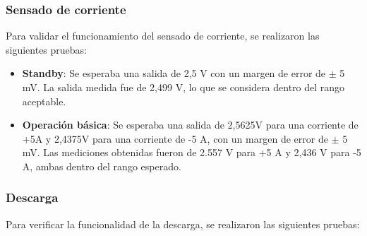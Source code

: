 \subsubsection{Sensado de corriente}

Para validar el funcionamiento del sensado de corriente, se realizaron las siguientes pruebas:

\begin{itemize}
	\item \textbf{Standby}: Se esperaba una salida de 2,5 V con un margen de error de $\pm$ 5 mV. La salida medida fue de 2,499 V, lo que se considera dentro del rango aceptable.
	
	\item \textbf{Operación básica}: Se esperaba una salida de 2,5625V para una corriente de +5A y 2,4375V para una corriente de -5 A, con un margen de error de $\pm$ 5 mV. Las mediciones obtenidas fueron de 2.557 V para +5 A y 2,436 V para -5 A, ambas dentro del rango esperado.
\end{itemize}	


\subsubsection{Descarga}

Para verificar la funcionalidad de la descarga, se realizaron las siguientes pruebas:

